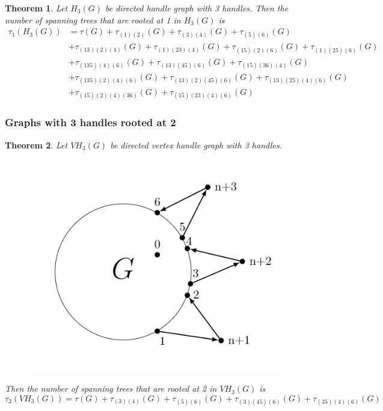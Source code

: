 \documentclass[twoside,11pt]{article}
\newtheorem{theorem}{Theorem}[section]
\numberwithin{equation}{section} \DeclareMathOperator{\Var}{Var}
\newcommand{\bthm}{\begin{theorem}}
\newcommand{\ethm}{\end{theorem}}
\begin{document}
\bthm \label{DH rooted at 1}
Let $H_3(G)$ be directed handle graph with 3 handles. Then the number of spanning trees that are rooted at 1 in $H_3(G)$ is
\begin{equation*}
    \begin{split}
        \tau_1(H_3(G)) &= \tau(G) + \tau_{(1)(2)}(G)+ \tau_{(3)(4)}(G) + \tau_{(5)(6)}(G)\\ 
        &+ \tau_{(13)(2)(4)}(G) + \tau_{(1)(23)(4)}(G) + \tau_{(15)(2)(6)}(G) + \tau_{(1)(25)(6)}(G)\\
        &+ \tau_{(135)(4)(6)}(G) + \tau_{(13)(45)(6)}(G) + \tau_{(15)(36)(4)}(G)\\
        &+ \tau_{(135)(2)(4)(6)}(G) + \tau_{(13)(2)(45)(6)}(G) + \tau_{(13)(25)(4)(6)}(G)\\
&+ \tau_{(15)(2)(4)(36)}(G) + \tau_{(15)(23)(4)(6)}(G)
    \end{split}
\end{equation*}
\ethm

\subsubsection{Graphs with 3 handles rooted at 2}
\bthm
Let $VH_3(G)$ be directed vertex handle graph with 3 handles.
\begin{figure}[H]
    \centering
    \includegraphics[scale=0.4]{tik_3handles.PNG}
\end{figure}
Then the number of spanning trees that are rooted at 2 in $VH_3(G)$ is
\[
\tau_2(VH_3(G)) = \tau(G) + \tau_{(3)(4)}(G) + \tau_{(5)(6)}(G) + \tau_{(3)(45)(6)}(G)+ \tau_{(35)(4)(6)}(G)
\]
\ethm
\end{document}
